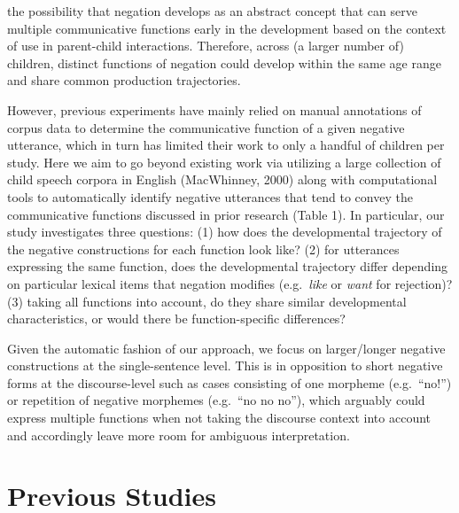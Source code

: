 \documentclass[
  english,
  man,floatsintext]{apa6}
\begin{document}
the possibility that negation develops as an abstract concept that can serve multiple communicative functions early in the development based on the context of use in parent-child interactions. Therefore, across (a larger number of) children, distinct functions of negation could develop within the same age range and share common production trajectories.

However, previous experiments have mainly relied on manual annotations of corpus data to determine the communicative function of a given negative utterance, which in turn has limited their work to only a handful of children per study. Here we aim to go beyond existing work via utilizing a large collection of child speech corpora in English (MacWhinney, 2000) along with computational tools to automatically identify negative utterances that tend to convey the communicative functions discussed in prior research (Table 1). In particular, our study investigates three questions: (1) how does the developmental trajectory of the negative constructions for each function look like? (2) for utterances expressing the same function, does the developmental trajectory differ depending on particular lexical items that negation modifies (e.g.~\emph{like} or \emph{want} for rejection)? (3) taking all functions into account, do they share similar developmental characteristics, or would there be function-specific differences?

Given the automatic fashion of our approach, we focus on larger/longer negative constructions at the single-sentence level. This is in opposition to short negative forms at the discourse-level such as cases consisting of one morpheme (e.g.~``no!'') or repetition of negative morphemes (e.g.~``no no no''), which arguably could express multiple functions when not taking the discourse context into account and accordingly leave more room for ambiguous interpretation.

\hypertarget{previous-studies}{%
\section{Previous Studies}\label{previous-studies}}
\end{document}
